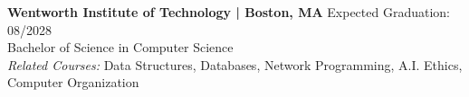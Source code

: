 \noindent
\textbf{Wentworth Institute of Technology | Boston, MA} \hfill Expected Graduation: 08/2028 \\
Bachelor of Science in Computer Science \\[6pt]
\textit{Related Courses:} Data Structures, Databases, Network Programming, A.I. Ethics, Computer Organization

